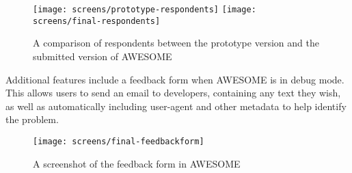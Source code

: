 	\begin{figure}[H]
		\texttt{[image: screens/prototype-respondents]}
		\texttt{[image: screens/final-respondents]}
		\caption{A comparison of respondents between the prototype version and the submitted version of \acs{AWESOME}}
		\label{fig:respondents-comparison}
	\end{figure}
	
	Additional features include a feedback form when \ac{AWESOME} is in debug mode.
	This allows users to send an email to developers, containing any text they wish, as well as automatically including user-agent and other metadata to help identify the problem.
	
	\begin{figure}[H]
		\texttt{[image: screens/final-feedbackform]}
		\caption{A screenshot of the feedback form in \acs{AWESOME}}
		\label{fig:feedbackform}
	\end{figure}
	